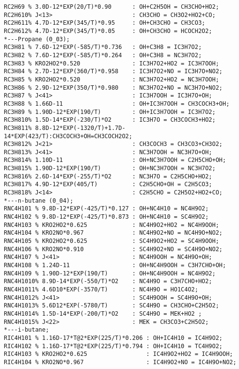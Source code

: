 \begin{verbatim}
RC2H69 % 3.0D-12*EXP(20/T)*0.90      : OH+C2H5OH = CH3CHO+HO2;
RC2H610% J<13>                       : CH3CHO = CH3O2+HO2+CO;
RC2H611% 4.7D-12*EXP(345/T)*0.95     : OH+CH3CHO = CH3CO3;
RC2H612% 4.7D-12*EXP(345/T)*0.05     : OH+CH3CHO = HCOCH2O2;
*---Propane (0_03);
RC3H81 % 7.6D-12*EXP(-585/T)*0.736   : OH+C3H8 = IC3H7O2;
RC3H82 % 7.6D-12*EXP(-585/T)*0.264   : OH+C3H8 = NC3H7O2;
RC3H83 % KRO2HO2*0.520               : IC3H7O2+HO2 = IC3H7OOH;
RC3H84 % 2.7D-12*EXP(360/T)*0.958    : IC3H7O2+NO = IC3H7O+NO2;
RC3H85 % KRO2HO2*0.520               : NC3H7O2+HO2 = NC3H7OOH;
RC3H86 % 2.9D-12*EXP(350/T)*0.980    : NC3H7O2+NO = NC3H7O+NO2;
RC3H87 % J<41>                       : IC3H7OOH = IC3H7O+OH;
RC3H88 % 1.66D-11                    : OH+IC3H7OOH = CH3COCH3+OH;
RC3H89 % 1.90D-12*EXP(190/T)         : OH+IC3H7OOH = IC3H7O2;
RC3H810% 1.5D-14*EXP(-230/T)*O2      : IC3H7O = CH3COCH3+HO2;
RC3H811% 8.8D-12*EXP(-1320/T)+1.7D-14*EXP(423/T):CH3COCH3+OH=CH3COCH2O2; 
RC3H812% J<21>                       : CH3COCH3 = CH3CO3+CH3O2;
RC3H813% J<41>                       : NC3H7OOH = NC3H7O+OH;
RC3H814% 1.10D-11                    : OH+NC3H7OOH = C2H5CHO+OH;
RC3H815% 1.90D-12*EXP(190/T)         : OH+NC3H7OOH = NC3H7O2;
RC3H816% 2.6D-14*EXP(-255/T)*O2      : NC3H7O = C2H5CHO+HO2;
RC3H817% 4.9D-12*EXP(405/T)          : C2H5CHO+OH = C2H5CO3;
RC3H818% J<14>                       : C2H5CHO = C2H5O2+HO2+CO;
*---n-butane (0_04);
RNC4H101 % 9.8D-12*EXP(-425/T)*0.127 : OH+NC4H10 = NC4H9O2;
RNC4H102 % 9.8D-12*EXP(-425/T)*0.873 : OH+NC4H10 = SC4H9O2;
RNC4H103 % KRO2HO2*0.625             : NC4H9O2+HO2 = NC4H9OOH;
RNC4H104 % KRO2NO*0.967              : NC4H9O2+NO = NC4H9O+NO2;
RNC4H105 % KRO2HO2*0.625             : SC4H9O2+HO2 = SC4H9OOH;
RNC4H106 % KRO2NO*0.910              : SC4H9O2+NO = SC4H9O+NO2;
RNC4H107 % J<41>                     : NC4H9OOH = NC4H9O+OH;	
RNC4H108 % 1.24D-11                  : OH+NC4H9OOH = C3H7CHO+OH;
RNC4H109 % 1.90D-12*EXP(190/T)       : OH+NC4H9OOH = NC4H9O2;
RNC4H1010% 8.9D-14*EXP(-550/T)*O2    : NC4H9O = C3H7CHO+HO2;
RNC4H1011% 4.6D10*EXP(-3570/T)       : NC4H9O = HO1C4O2;
RNC4H1012% J<41>                     : SC4H9OOH = SC4H9O+OH;
RNC4H1013% 5.6D12*EXP(-5780/T)       : SC4H9O = CH3CHO+C2H5O2;
RNC4H1014% 1.5D-14*EXP(-200/T)*O2    : SC4H9O = MEK+HO2 ;
RNC4H1015% J<22>                     : MEK = CH3CO3+C2H5O2;
*---i-butane;
RIC4H101 % 1.16D-17*T@2*EXP(225/T)*0.206 : OH+IC4H10 = IC4H9O2;
RIC4H102 % 1.16D-17*T@2*EXP(225/T)*0.794 : OH+IC4H10 = TC4H9O2;
RIC4H103 % KRO2HO2*0.625                 : IC4H9O2+HO2 = IC4H9OOH;
RIC4H104 % KRO2NO*0.967                  : IC4H9O2+NO = IC4H9O+NO2;

\end{verbatim}
